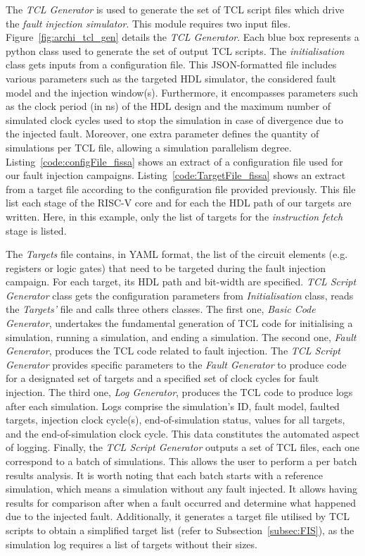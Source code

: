 The \textit{TCL Generator} is used to generate the set of TCL script files which drive the \textit{fault injection simulator}. This module requires two input files.
Figure~\ref{fig:archi_tcl_gen} details the \textit{TCL Generator}. Each blue box represents a python class used to generate the set of output TCL scripts.
The \textit{initialisation} class gets inputs from a configuration file. This JSON-formatted file includes various parameters such as the targeted HDL simulator, the considered fault model and the injection window(s). Furthermore, it encompasses parameters such as the clock period (in ns) of the HDL design and the maximum number of simulated clock cycles used to stop the simulation in case of divergence due to the injected fault. Moreover, one extra parameter defines the quantity of simulations per TCL file, allowing a simulation parallelism degree.
Listing~\ref{code:configFile_fissa} shows an extract of a configuration file used for our fault injection campaigns.
Listing~\ref{code:TargetFile_fissa} shows an extract from a target file according to the configuration file provided previously. This file list each stage of the RISC-V core and for each the HDL path of our targets are written. Here, in this example, only the list of targets for the \textit{instruction fetch} stage is listed.

The \textit{Targets} file contains, in YAML format, the list of the circuit elements (e.g. registers or logic gates) that need to be targeted during the fault injection campaign. For each target, its HDL path and bit-width are specified.
\textit{TCL Script Generator} class gets the configuration parameters from \textit{Initialisation} class, reads the \textit{Targets'} file and calls three others classes.
The first one, \textit{Basic Code Generator}, undertakes the fundamental generation of TCL code for initialising a simulation, running a simulation, and ending a simulation.
The second one, \textit{Fault Generator}, produces the TCL code related to fault injection. The \textit{TCL Script Generator} provides specific parameters to the \textit{Fault Generator} to produce code for a designated set of targets and a specified set of clock cycles for fault injection.
The third one, \textit{Log Generator}, produces the TCL code to produce logs after each simulation.
Logs comprise the simulation's ID, fault model, faulted targets, injection clock cycle(s), end-of-simulation status, values for all targets, and the end-of-simulation clock cycle. This data constitutes the automated aspect of logging.
Finally, the \textit{TCL Script Generator} outputs a set of TCL files, each one correspond to a batch of simulations. This allows the user to perform a per batch results analysis. It is worth noting that each batch starts with a reference simulation, which means a simulation without any fault injected. It allows having results for comparison after when a fault occurred and determine what happened due to the injected fault.
Additionally, it generates a target file utilised by TCL scripts to obtain a simplified target list (refer to Subsection~\ref{subsec:FIS}), as the simulation log requires a list of targets without their sizes.

